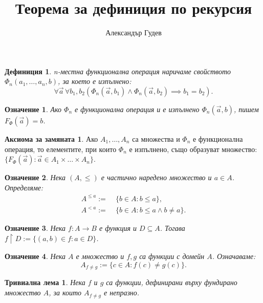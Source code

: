 \documentclass{article}
\title{Теорема за дефиниция по рекурсия}
\author{Александър Гудев}
\date{\vspace{-0.4in}}
\newtheorem{tlemma}{Тривиална лема}
\newtheorem{deff}{Дефиниция}
\newtheorem{notation}{Означение}
\theoremstyle{definition}
\begin{document}
\maketitle

\setlength{\columnsep}{0.5cm}
\begin{multicols}{2}

\begin{deff}
    \emph{n-местна функционална операция} наричаме свойството $\Phi_n(a_1,\ldots,a_n, b)$, за което е изпълнено:
    \[
        \forall{\vec{a}}\,\forall{b_1,b_2} (\Phi_n(\vec{a},b_1) \land \Phi_n(\vec{a},b_2) \implies b_1 = b_2).
    \]
\end{deff}

\begin{notation}
    Ако $\Phi_n$ е функционална операция и е изпълнено $\Phi_n(\vec{a},b)$, пишем $F_\Phi(\vec{a})=b$.
\end{notation}

\newtheorem*{axiom}{Аксиома за замяната}
\begin{axiom}
    Ако $A_1, \ldots, A_n$ са множества и $\Phi_n $ е функционална операция, то елементите, при които $\Phi_n$ е изпълнено, също образуват множество:
    \(\{ F_\Phi(\vec{a}) \colon \vec{a} \in A_1\!\times\!\ldots\!\times\!A_n \}\).
\end{axiom}

\begin{notation}
    Нека $(A, \le)$ е частично наредено множество и $a \in A$. Определяме:
    \begin{align*}
        A^{\le a} :=& \;\{ b \in A: b \le a \},\\
        A^{<a} :=& \; \{ b \in A: b \le a \land b \not = a \}.
    \end{align*}
\end{notation}

\begin{notation}
    Нека $f: A \rightarrow B$ е функция и $D \subseteq A$. Тогава
    \(f \upharpoonright D := \{(a,b) \in f: a \in D \}\).
\end{notation}

\begin{notation}
    Нека $A$ е множество и $f,g$ са функции с домейн $A$. Означаваме:
    \[A_{f\not=g} := \{c \in A: f(c) \not= g(c)\}.\]
\end{notation}

\begin{tlemma}
    Нека $f$ и $g$ са функции, дефинирани върху фундирано множество $A$, за които
    $A_{f\not=g}$ е непразно.


\end{tlemma}
\end{multicols}
\end{document}
